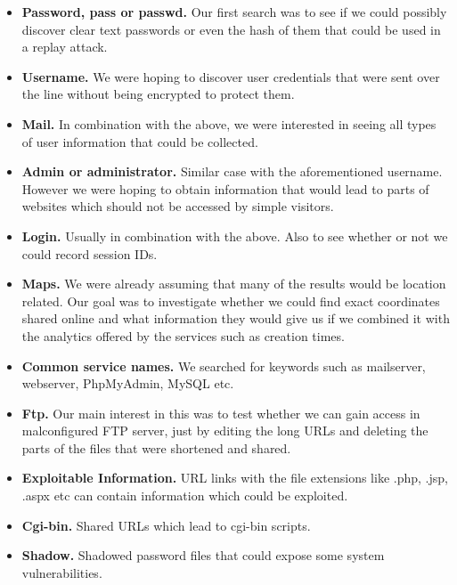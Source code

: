 \documentclass[12pt]{article}
\begin{document}
\begin{itemize}

\item \textbf{Password, pass or passwd.} Our first search was to see if we could possibly discover clear text passwords or even the hash of them that could be used in a replay attack.

\item \textbf{Username.} We were hoping to discover user credentials that were sent over the line without being encrypted to protect them.

\item \textbf{Mail.} In combination with the above, we were interested in seeing all types of user information that could be collected.

\item \textbf{Admin or administrator.} Similar case with the aforementioned username. However we were hoping to obtain information that would lead to parts of websites which should not be accessed by simple visitors.

\item \textbf{Login.} Usually in combination with the above. Also to see whether or not we could record session IDs.

\item \textbf{Maps.} We were already assuming that many of the results would be location related. Our goal was to investigate whether we could find exact coordinates shared online and what information they would give us if we combined it with the analytics offered by the services such as creation times.

 \item \textbf{Common service names.} We searched for keywords such as mailserver, webserver, PhpMyAdmin, MySQL etc.

\item \textbf{Ftp.} Our main interest in this was to test whether we can gain access in malconfigured FTP server, just by editing the long URLs and deleting the parts of the files that were shortened and shared.

\item \textbf{Exploitable Information.} URL links with the file extensions like .php, .jsp, .aspx etc can contain information which could be exploited.

\item \textbf{Cgi-bin.} Shared URLs which lead to cgi-bin scripts.

\item \textbf{Shadow.} Shadowed password files that could expose some system vulnerabilities.


\end{itemize}
\end{document}
